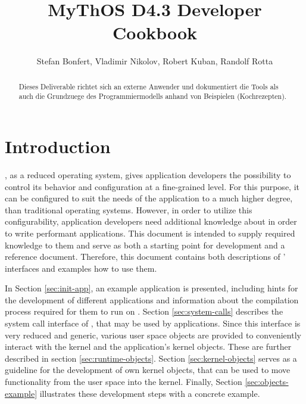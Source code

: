 

\title{MyThOS D4.3 Developer Cookbook}
\author{Stefan Bonfert, Vladimir Nikolov, Robert Kuban, Randolf Rotta}



\maketitle

\begin{abstract}

Dieses Deliverable richtet sich an externe Anwender und dokumentiert die Tools
als auch die Grundzuege des Programmiermodells anhand von Beispielen
(Kochrezepten).

\end{abstract}

\newpage
\tableofcontents


\section{Introduction}
\mythos, as a reduced operating system, gives application developers the
possibility to control its behavior and configuration at a fine-grained level.
For this purpose, it can be configured to suit the needs of the application to a
much higher degree, than traditional operating systems. However, in order to
utilize this configurability, application developers need additional knowledge
about \mythos in order to write performant applications. This document is
intended to supply required knowledge to them and serve as both a starting point
for development and a reference document. Therefore, this document contains both
descriptions of \mythos' interfaces and examples how to use them.

In Section \ref{sec:init-app}, an example application is presented, including
hints for the development of different applications and information about the
compilation process required for them to run on \mythos. Section
\ref{sec:system-calls} describes the system call interface of \mythos, that may
be used by applications. Since this interface is very reduced and generic,
various user space objects are provided to conveniently interact with the kernel
and the application's kernel objects. These are further described in section
\ref{sec:runtime-objects}. Section \ref{sec:kernel-objects} serves as a
guideline for the development of own kernel objects, that can be used to move
functionality from the user space into the kernel. Finally, Section
\ref{sec:objects-example} illustrates these development steps with a concrete
example.

